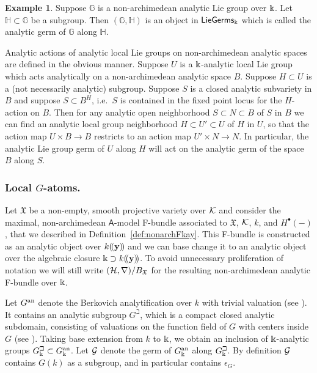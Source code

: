 \documentclass[twoside,leqno]{article}
\numberwithin{equation}{section}
\theoremstyle{plain}
\theoremstyle{definition}
\newtheorem{example}[equation]{Example}
\begin{document}
\begin{example} \label{ex:germG}
Suppose $\mathbb{G}$ is a non-archimedean analytic Lie group over $\Bbbk$. Let $\mathbb{H} \subset \mathbb{G}$ be a subgroup.   Then 
$(\mathbb{G},\mathbb{H})$ is an object in $\mathsf{LieGerms}_{\Bbbk}$ which is called the analytic germ  of $\mathbb{G}$ along $\mathbb{H}$.
\end{example}


Analytic actions of analytic local Lie groups on non-archimedean analytic spaces are defined in the obvious manner. Suppose $U$ is a $\Bbbk$-analytic local Lie group which acts analytically on a non-archimedean analytic space $B$. Suppose $H \subset U$ is a (not necessarily analytic) subgroup. Suppose $S$ is a closed analytic subvariety in $B$ and suppose $S \subset B^{H}$, i.e.\ $S$ is contained in the fixed point locus for the $H$-action on $B$. Then for any analytic open neighborhood $S \subset N \subset B$ of $S$ in $B$ we can find an analytic local group neighborhood $H \subset U' \subset U$ of $H$ in $U$, so that the action map $U \times B \to B$ restricts to an action map $U'\times N \to N$. In particular, the analytic Lie group germ of $U$ along $H$ will act on the analytic germ of the space $B$ along $S$.

\subsubsection{Local $G$-atoms.} \label{sssec:localGatoms}

Let $\mathfrak{X}$ be a non-empty, smooth projective variety over $\mathcal K$ and consider the maximal, non-archimedean $\mathsf{A}$-model F-bundle associated to $\mathfrak{X}$, $\mathcal K$, $k$, and $H^{\bullet}(-)$, that we described in Definition~\ref{def:nonarchFkay}.
This F-bundle is constructed as an analytic  object over $k(\!(\mathbf{y})\!)$ and we can base change  it to an analytic object  over the algebraic  closure
$\Bbbk \supset k(\!(\mathbf{y})\!)$. To avoid unnecessary proliferation of notation we will still write  $(\mathcal H,\nabla)/B_{\mathfrak{X}}$ for the resulting non-archimedean analytic F-bundle over $\Bbbk$. 


Let $G^{\mathrm{an}}$ denote the Berkovich analytification over $k$ with trivial valuation (see \cite{Berkovich_Spectral_theory}).
It contains an analytic subgroup $G^\beth$, which is a compact closed analytic subdomain, consisting of valuations on the function field of $G$ with centers inside $G$ (see \cite[Definition 1.3]{Thuillier_Geometrie_toroidale}).
Taking base extension from $k$ to $\Bbbk$, we obtain an inclusion of $\Bbbk$-analytic groups $G_\Bbbk^\beth \subset G_\Bbbk^{\mathrm{an}}$.
Let $\mathcal{G}$ denote the germ of $G_\Bbbk^{\mathrm{an}}$ along $G_\Bbbk^\beth$.
By definition $\mathcal{G}$ contains $G(k)$ as a subgroup, and in particular contains $\epsilon_{G}$.
\end{document}
